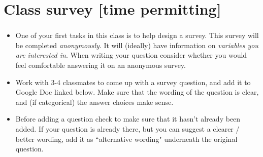 \documentclass[11pt,containsverbatim,handout,xcolor=xelatex,dvipsnames,table]{beamer}
\begin{document}

\section{Class survey [time permitting]}


\begin{frame}
\frametitle{}

{
\begin{itemize}
    \setlength{\itemsep}{0pt}
    \setlength{\parskip}{0pt}
\item One of your first tasks in this class is to help design a survey. This survey will be completed \emph{anonymously}. It will (ideally) have information on \emph{variables you are interested in}. When writing your question consider whether you would feel comfortable answering it on an anonymous survey.

\item Work with 3-4 classmates to come up with a survey question, and add it to Google Doc linked below. Make sure that the wording of the question is clear, and (if categorical) the answer choices make sense.
\begin{center}
\end{center}

\item Before adding a question check to make sure that it hasn't already been added. If your question is already there, but you can suggest a clearer / better wording, add it as ``alternative wording" underneath the original question.
\end{itemize}
}

\end{frame}

\end{document}
